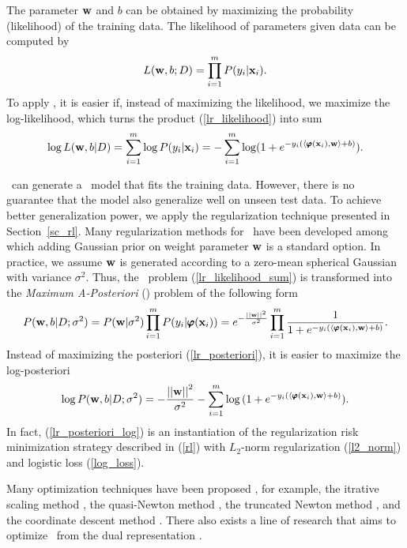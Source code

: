 {%
The parameter $\mathbf {w}$ and $b$ can be obtained by maximizing the probability (likelihood) of the training data.
The likelihood of parameters given data can be computed by
\begin{align}
	L(\mathbf {w},b;D) = \prod_{i=1}^mP(y_i|\mathbf {x}_i). \label{lr_likelihood}
\end{align}
To apply \mle, it is easier if, instead of maximizing the likelihood, we maximize the log-likelihood, which turns the product (\ref{lr_likelihood}) into sum
\begin{align}
	\log L(\mathbf {w},b|D) = \sum_{i=1}^{m}\log P(y_i|\mathbf {x}_i) = -\sum_{i=1}^{m}\log (1+e^{ -y_i(\langle \pmb \varphi(\mathbf {x}_i), \mathbf {w} \rangle+b) }) \label{lr_likelihood_sum}.
\end{align}

\mle\ can generate a \lr\ model that fits the training data.
However, there is no guarantee that the model also generalize well on unseen test data.
To achieve better generalization power, we apply the regularization technique presented in Section~\ref{sc_rl}.
Many regularization methods for \lr\ have been developed \citep{Chen99,Chen00,Goodman03} among which adding Gaussian prior on weight parameter $\mathbf {w}$ is a standard option.
In practice, we assume $\mathbf {w}$ is generated according to a zero-mean spherical Gaussian with variance $\sigma^2$.
Thus, the \mle\ problem (\ref{lr_likelihood_sum}) is transformed into the \textit{Maximum A-Posteriori} (\map) problem of the following form
\begin{align}
	P(\mathbf {w},b|D;\sigma^2) = P(\mathbf {w}|\sigma^2)\prod_{i=1}^mP(y_i|\pmb \varphi(\mathbf {x}_i))=e^{ -\frac{\left|\left| \mathbf {w} \right|\right|^2}{\sigma^2} }\prod_{i=1}^{m}{\frac{1}{1+e^{ -y_i(\langle \pmb \varphi(\mathbf {x}_i), \mathbf {w} \rangle+b) }}}. \label{lr_posteriori}
\end{align}
Instead of maximizing the posteriori (\ref{lr_posteriori}), it is easier to maximize the log-posteriori
\begin{align}
	\log P(\mathbf {w},b|D;\sigma^2) = -{\frac{\left|\left| \mathbf {w} \right|\right|^2}{\sigma^2}} - \sum_{i=1}^{m}\log{(1+e^{ -y_i(\langle \pmb \varphi(\mathbf {x}_i), \mathbf {w}\rangle+b) })}. \label{lr_posteriori_log}
\end{align}
In fact, (\ref{lr_posteriori_log}) is an instantiation of the regularization risk minimization strategy described in (\ref{rl}) with $L_2$-norm regularization (\ref{l2_norm}) and logistic loss (\ref{log_loss}).

Many optimization techniques have been proposed \citep{Minka03}, for example, 
the {itrative scaling} method \citep{Darroch72,Pietra97inducing,Berger97,Goodman02Sequential,Jin03a},
the quasi-Newton method \citep{Minka03},
the truncated Newton method \citep{Komarek05making,Lin2008trust},
and the coordinate descent method \citep{Huang09iterative}.
There also exists a line of research that aims to optimize \lr\ from the dual representation \citep{Jaakkola99probabilistic,Keerthi05a,Yu11dual}.




}
